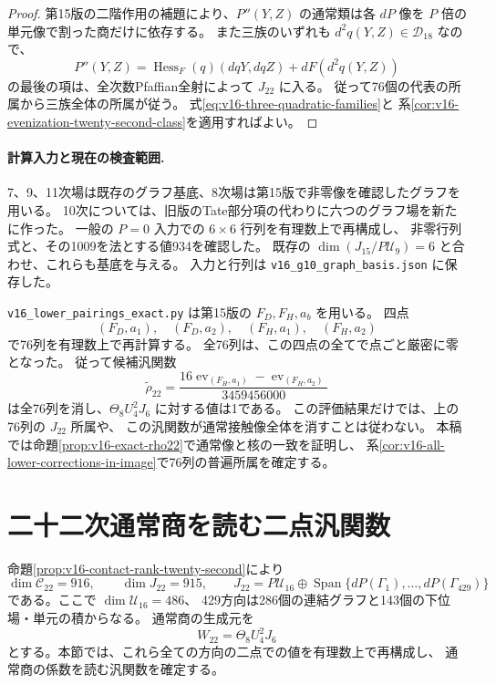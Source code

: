 \begin{proof}
第15版の二階作用の補題により、$P''(Y,Z)$ の通常類は各 $dP$ 像を
$P$ 倍の単元像で割った商だけに依存する。
また三族のいずれも $d^2q(Y,Z)\in\mathcal D_{18}$ なので、
\[
 P''(Y,Z)=\operatorname{Hess}_F(q)(dqY,dqZ)+dF(d^2q(Y,Z))
\]
の最後の項は、全次数Pfaffian全射によって $J_{22}$ に入る。
従って76個の代表の所属から三族全体の所属が従う。
式\eqref{eq:v16-three-quadratic-families}と
系\ref{cor:v16-evenization-twenty-second-class}を適用すればよい。
\end{proof}

\paragraph{計算入力と現在の検査範囲.}
7、9、11次場は既存のグラフ基底、8次場は第15版で非零像を確認したグラフを用いる。
10次については、旧版のTate部分項の代わりに六つのグラフ場を新たに作った。
一般の $P=0$ 入力での $6\times6$ 行列を有理数上で再構成し、
非零行列式と、その1009を法とする値934を確認した。
既存の $\dim(J_{15}/P\mathcal U_9)=6$ と合わせ、これらも基底を与える。
入力と行列は \nolinkurl{v16_g10_graph_basis.json} に保存した。

\nolinkurl{v16_lower_pairings_exact.py} は第15版の $F_D,F_H,a_b$ を用いる。
四点
\[
 (F_D,a_1),\quad(F_D,a_2),\quad(F_H,a_1),\quad(F_H,a_2)
\]
で76列を有理数上で再計算する。
全76列は、この四点の全てで点ごと厳密に零となった。
従って候補汎関数
\[
 \widetilde\rho_{22}
 =\frac{16\operatorname{ev}_{(F_H,a_1)}-
                \operatorname{ev}_{(F_H,a_2)}}{3459456000}
\]
は全76列を消し、$\Theta_8U_4^2J_6$ に対する値は1である。
この評価結果だけでは、上の76列の $J_{22}$ 所属や、
この汎関数が通常接触像全体を消すことは従わない。
本稿では命題\ref{prop:v16-exact-rho22}で通常像と核の一致を証明し、
系\ref{cor:v16-all-lower-corrections-in-image}で76列の普遍所属を確定する。




\section{二十二次通常商を読む二点汎関数}
\label{sec:v16-exact-twenty-second-detector}

命題\ref{prop:v16-contact-rank-twenty-second}により
\[
 \dim\mathcal C_{22}=916,\qquad
 \dim J_{22}=915,\qquad
 J_{22}=P\mathcal U_{16}
    \oplus\operatorname{Span}\{dP(\Gamma_1),\ldots,dP(\Gamma_{429})\}
\]
である。ここで $\dim\mathcal U_{16}=486$、
429方向は286個の連結グラフと143個の下位場・単元の積からなる。
通常商の生成元を
\[
                      W_{22}=\Theta_8U_4^2J_6
\]
とする。本節では、これら全ての方向の二点での値を有理数上で再構成し、
通常商の係数を読む汎関数を確定する。

